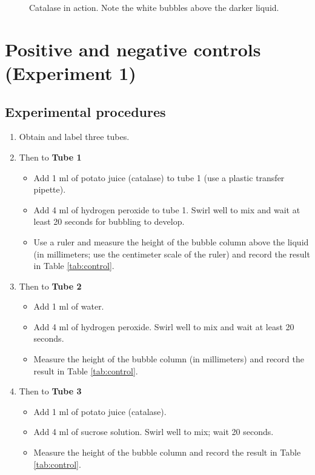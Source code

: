 \begin{figure}
{}

\caption{Catalase in action. Note the white bubbles above the darker liquid.}\label{fig:catalase}
\end{figure}

\section{Positive and negative controls (Experiment
1)}\label{positive-and-negative-controls-experiment-1}

\subsection{Experimental procedures}\label{experimental-procedures-17}

\begin{enumerate}
\def\labelenumi{\arabic{enumi}.}
\tightlist
\item
  Obtain and label three tubes.
\item
  Then to \textbf{Tube 1}

  \begin{itemize}
  \tightlist
  \item
    Add 1 ml of potato juice (catalase) to tube 1 (use a plastic
    transfer pipette).
  \item
    Add 4 ml of hydrogen peroxide to tube 1. Swirl well to mix and wait
    at least 20 seconds for bubbling to develop.
  \item
    Use a ruler and measure the height of the bubble column above the
    liquid (in millimeters; use the centimeter scale of the ruler) and
    record the result in Table \ref{tab:control}.
  \end{itemize}
\item
  Then to \textbf{Tube 2}

  \begin{itemize}
  \tightlist
  \item
    Add 1 ml of water.
  \item
    Add 4 ml of hydrogen peroxide. Swirl well to mix and wait at least
    20 seconds.
  \item
    Measure the height of the bubble column (in millimeters) and record
    the result in Table \ref{tab:control}.
  \end{itemize}
\item
  Then to \textbf{Tube 3}

  \begin{itemize}
  \tightlist
  \item
    Add 1 ml of potato juice (catalase).
  \item
    Add 4 ml of sucrose solution. Swirl well to mix; wait 20 seconds.
  \item
    Measure the height of the bubble column and record the result in
    Table \ref{tab:control}.
  \end{itemize}
\end{enumerate}

